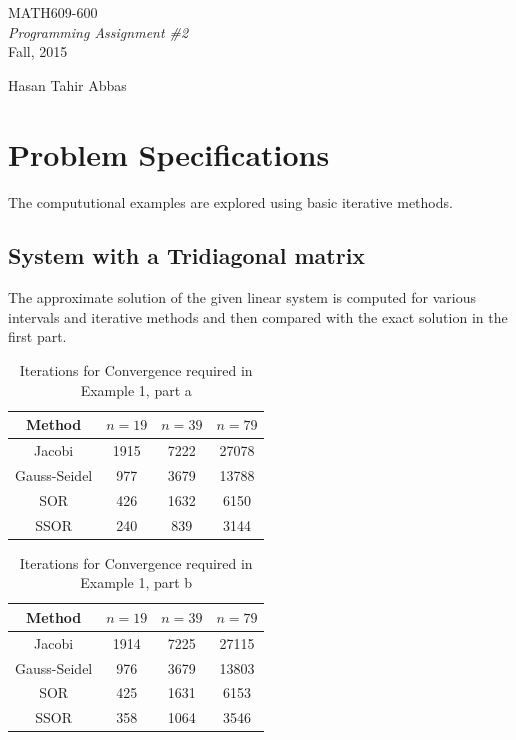 \documentclass[11pt]{article}
\begin{document}
\begin{titlepage}

\vspace*{55mm}
\begin{center}
{\huge MATH609-600}\\[1cm]
{\em \huge Programming Assignment \#2}\\[70mm]
{\large Fall, 2015} \\[15mm]
\end{center}

\begin{flushright}
{\LARGE Hasan Tahir Abbas}
\end{flushright}

\vfill

\end{titlepage}

\newpage
\section{Problem Specifications}
The compututional examples are explored using basic iterative methods.


\subsection{System with a Tridiagonal matrix}

The approximate solution of the given linear system is computed for various intervals and iterative methods and then compared with the exact solution in the first part.

\begin{table}[!hbt]
\begin{center}
{\def\arraystretch{.95}
\begin{tabular}{|c|c|c|c|}
\hline
Method & $n = 19$  &  $n = 39$  &  $n = 79$\\
\hline
Jacobi & 1915 & 7222& 27078\\ 
\hline
Gauss-Seidel & 977 & 3679 & 13788\\
\hline
SOR & 426 & 1632 & 6150\\
\hline
SSOR & 240 & 839 & 3144\\
\hline
\end{tabular}}
\end{center}
\caption{Iterations for Convergence required in Example 1, part a}
\end{table}
\begin{table}[!hbt]
\begin{center}
{\def\arraystretch{.95}
\begin{tabular}{|c|c|c|c|}
\hline
Method & $n = 19$  &  $n = 39$  &  $n = 79$\\
\hline
Jacobi & 1914 & 7225& 27115\\ 
\hline
Gauss-Seidel & 976 & 3679 & 13803\\
\hline
SOR & 425 & 1631 & 6153\\
\hline
SSOR &358 & 1064 & 3546\\
\hline
\end{tabular}}
\end{center}
\caption{Iterations for Convergence required in Example 1, part b}
\end{table}
\end{document}
